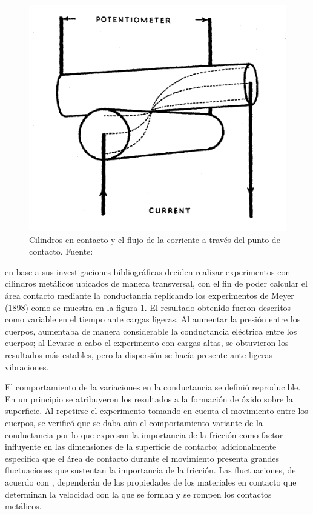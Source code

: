 \documentclass[main]{subfiles}
\begin{document}
\begin{figure}[!htbp]
\centering
    \includegraphics[scale=0.5]{Bowden1.png}
  \caption{Cilindros en contacto y el flujo de la corriente a través del punto de contacto. Fuente: \citet{Bowden07021939}}
  \label{fig:CilBownden}
\end{figure}   
  
\citet{Bowden07021939} en base a sus investigaciones bibliográficas deciden realizar experimentos con cilindros metálicos ubicados de manera transversal, con el fin de poder calcular el área contacto mediante la conductancia replicando los experimentos de Meyer (1898) como se muestra en la figura \ref{fig:CilBownden}. El resultado obtenido fueron descritos como variable en el tiempo ante cargas ligeras. Al aumentar la presión entre los cuerpos, aumentaba de manera considerable la conductancia eléctrica entre los cuerpos; al llevarse a cabo el experimento con cargas altas, se obtuvieron los resultados más estables, pero la dispersión se hacía presente ante ligeras vibraciones.

El comportamiento de la variaciones en la conductancia se definió  reproducible. En un principio se atribuyeron los resultados a la formación de óxido sobre la superficie. Al repetirse el experimento tomando en cuenta el movimiento entre los cuerpos, se verificó que se daba aún el comportamiento variante de la conductancia por lo que \citet{Bowden07021939} expresan la importancia de la fricción como factor influyente en las dimensiones de la superficie de contacto; adicionalmente especifica que el área
de contacto durante el movimiento presenta grandes fluctuaciones que sustentan la importancia de la fricción. Las fluctuaciones, de acuerdo con \citet{Bowden07021939}, dependerán de las propiedades de los materiales en contacto que determinan la velocidad con la que se forman y se rompen los contactos metálicos.
  
\end{document}
